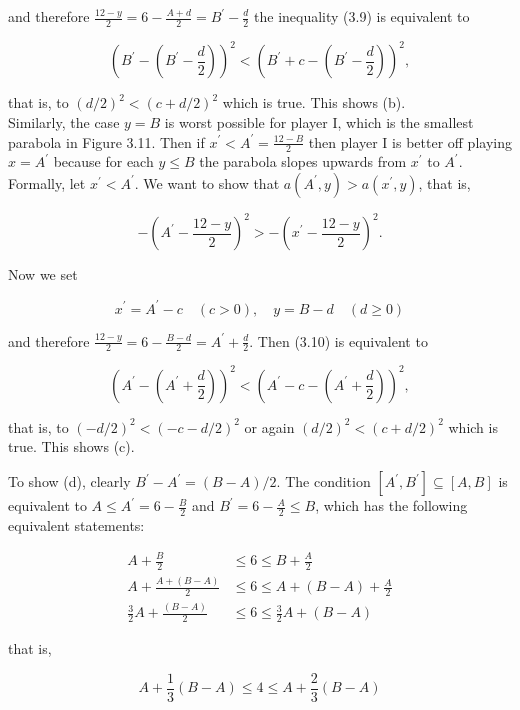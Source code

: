 \documentclass[12pt]{article}
\begin{document}
and therefore $\frac{12-y}{2}=6-\frac{A+d}{2}=B^{\prime}-\frac{d}{2}$ the inequality (3.9) is equivalent to

$$
\left(B^{\prime}-\left(B^{\prime}-\frac{d}{2}\right)\right)^{2}<\left(B^{\prime}+c-\left(B^{\prime}-\frac{d}{2}\right)\right)^{2},
$$

that is, to $(d / 2)^{2}<(c+d / 2)^{2}$ which is true. This shows (b).\\
Similarly, the case $y=B$ is worst possible for player I, which is the smallest parabola in Figure 3.11. Then if $x^{\prime}<A^{\prime}=\frac{12-B}{2}$ then player I is better off playing $x=A^{\prime}$ because for each $y \leq B$ the parabola slopes upwards from $x^{\prime}$ to $A^{\prime}$. Formally, let $x^{\prime}<A^{\prime}$. We want to show that $a\left(A^{\prime}, y\right)>a\left(x^{\prime}, y\right)$, that is,


\begin{equation*}
-\left(A^{\prime}-\frac{12-y}{2}\right)^{2}>-\left(x^{\prime}-\frac{12-y}{2}\right)^{2} . \tag{3.10}
\end{equation*}


Now we set

$$
x^{\prime}=A^{\prime}-c \quad(c>0), \quad y=B-d \quad(d \geq 0)
$$

and therefore $\frac{12-y}{2}=6-\frac{B-d}{2}=A^{\prime}+\frac{d}{2}$. Then (3.10) is equivalent to

$$
\left(A^{\prime}-\left(A^{\prime}+\frac{d}{2}\right)\right)^{2}<\left(A^{\prime}-c-\left(A^{\prime}+\frac{d}{2}\right)\right)^{2},
$$

that is, to $(-d / 2)^{2}<(-c-d / 2)^{2}$ or again $(d / 2)^{2}<(c+d / 2)^{2}$ which is true. This shows (c).

To show (d), clearly $B^{\prime}-A^{\prime}=(B-A) / 2$. The condition $\left[A^{\prime}, B^{\prime}\right] \subseteq[A, B]$ is equivalent to $A \leq A^{\prime}=6-\frac{B}{2}$ and $B^{\prime}=6-\frac{A}{2} \leq B$, which has the following equivalent statements:

$$
\begin{aligned}
A+\frac{B}{2} & \leq 6 \leq B+\frac{A}{2} \\
A+\frac{A+(B-A)}{2} & \leq 6 \leq A+(B-A)+\frac{A}{2} \\
\frac{3}{2} A+\frac{(B-A)}{2} & \leq 6 \leq \frac{3}{2} A+(B-A)
\end{aligned}
$$

that is,


\begin{equation*}
A+\frac{1}{3}(B-A) \leq 4 \leq A+\frac{2}{3}(B-A) \tag{3.11}
\end{equation*}
\end{document}
